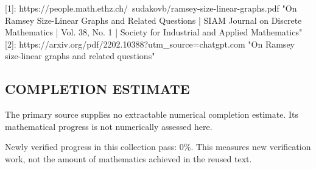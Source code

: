 [1]: https://people.math.ethz.ch/~sudakovb/ramsey-size-linear-graphs.pdf "On Ramsey Size-Linear Graphs and Related Questions | SIAM Journal on Discrete Mathematics | Vol. 38, No. 1 | Society for Industrial and Applied Mathematics"
[2]: https://arxiv.org/pdf/2202.10388?utm_source=chatgpt.com "On Ramsey size-linear graphs and related questions"


\subsection*{COMPLETION ESTIMATE}
The primary source supplies no extractable numerical completion estimate. Its mathematical progress is not numerically assessed here.

Newly verified progress in this collection pass: $0\%$. This measures new verification work, not the amount of mathematics achieved in the reused text.
